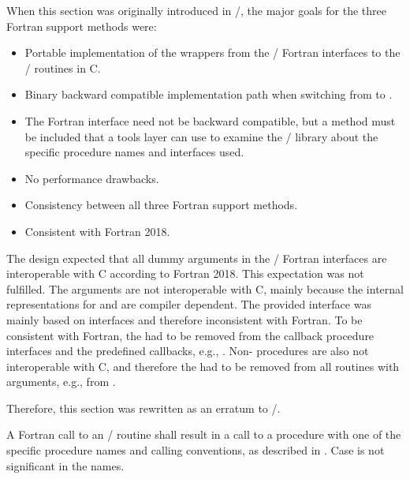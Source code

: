 \begin{rationale}
When this section was originally introduced in \MPIIIIDOTO/,
the major goals for the three
Fortran support methods were:
\begin{itemize}
  \item
  Portable implementation of the wrappers
  from the \MPI/ Fortran interfaces to the \MPI/ routines in C.
  \item
  Binary backward compatible implementation path when switching
   from  to .
  \item
  The Fortran  interface need not be backward compatible,
  but a method must be included that a tools layer can use to examine the
  \MPI/ library about the specific procedure names and interfaces used.
  \item
  No performance drawbacks.
  \item
  Consistency between all three Fortran support methods.
  \item
  Consistent with Fortran 2018.
\end{itemize}
The design expected that all dummy arguments in the
\MPI/ Fortran interfaces are interoperable with C according
to Fortran 2018.
This expectation was not fulfilled.
The  arguments are not interoperable with C,
mainly because the internal representations for  and
 are compiler dependent.
The provided interface was mainly based on  interfaces
and therefore inconsistent with Fortran.
To be consistent with Fortran, the  had to be
removed from the callback procedure interfaces and the predefined callbacks,
e.g., .
Non- procedures are also not interoperable with C,
and therefore the  had to be removed from all routines
with  arguments,
e.g., from .

Therefore, this section was rewritten as an erratum to \MPIIIIDOTO/.
\end{rationale}

A Fortran call to an \MPI/ routine shall result in a call to a procedure
with one of the specific procedure names and calling conventions, as described in
.
Case is not significant in the names.


